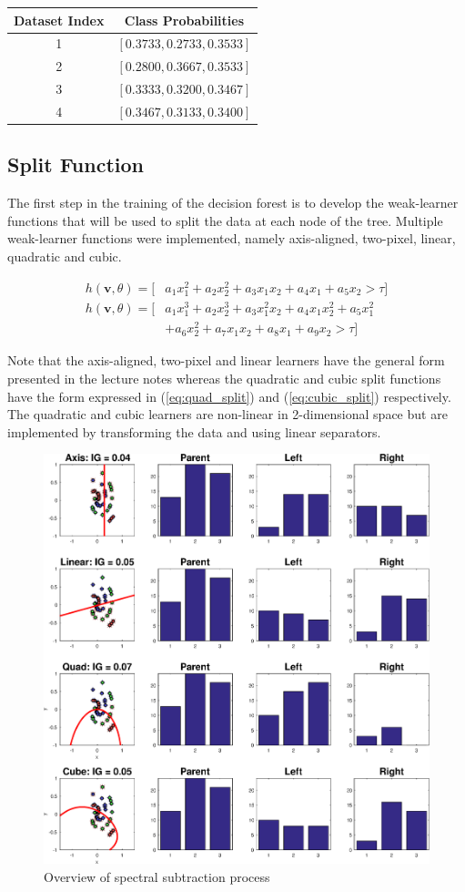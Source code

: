 \documentclass[a4paper,pra,twocolumn,10pt,aps,longbibliography,nobalancelastpage]{revtex4-1}
\begin{document}
\begin{table}[H]
\centering
\begin{tabular}{|c|c|}
\hline
Dataset Index & Class Probabilities 		\\ \hline
1             & $[0.3733, 0.2733, 0.3533]$  	\\ \hline
2             & $[0.2800, 0.3667, 0.3533]$  	\\ \hline
3             & $[0.3333, 0.3200, 0.3467]$ 	\\ \hline
4             & $[0.3467, 0.3133, 0.3400]$  	\\ \hline
\end{tabular}
\end{table}

\subsection{Split Function}

The first step in the training of the decision forest is to develop the weak-learner functions that will be used to split the data at each node of the tree. Multiple weak-learner functions were implemented, namely axis-aligned, two-pixel, linear, quadratic and cubic.

\begin{align}
h(\textbf{v}, \theta) = [&a_1x_1^2+a_2x_2^2+a_3x_1x_2+a_4x_1+a_5x_2>\tau] \label{eq:quad_split} \\
h(\textbf{v}, \theta) = [&a_1x_1^3+a_2x_2^3+a_3x_1^2x_2+a_4x_1x_2^2+a_5x_1^2 \nonumber\\
&+a_6x_2^2+a_7x_1x_2+a_8x_1+a_9x_2>\tau] \label{eq:cubic_split}
\end{align}

Note that the axis-aligned, two-pixel and linear learners have the general form presented in the lecture notes whereas the quadratic and cubic split functions have the form expressed in (\ref{eq:quad_split}) and (\ref{eq:cubic_split}) respectively. The quadratic and cubic learners are non-linear in 2-dimensional space but are implemented by transforming the data and using linear separators.

\begin{figure}[H]
	\centering
    \includegraphics[width=0.60\columnwidth]{split_function_visualitions_1}
    \caption{Overview of spectral subtraction process}
    \label{fig:ex_func}
\end{figure}
\end{document}
